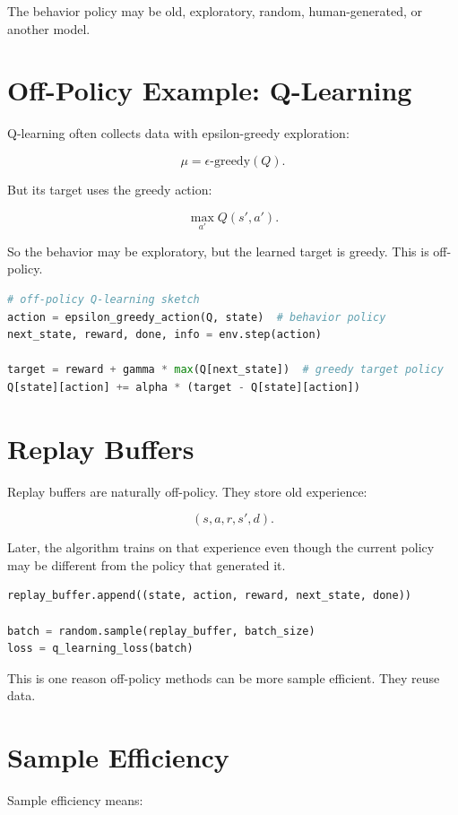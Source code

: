 \documentclass[11pt]{article}
\begin{document}
The behavior policy may be old, exploratory, random, human-generated, or another model.

\section{Off-Policy Example: Q-Learning}

Q-learning often collects data with epsilon-greedy exploration:

\[
\mu = \epsilon\text{-greedy}(Q).
\]

But its target uses the greedy action:

\[
\max_{a'} Q(s',a').
\]

So the behavior may be exploratory, but the learned target is greedy.
This is off-policy.

\begin{lstlisting}[language=Python]
# off-policy Q-learning sketch
action = epsilon_greedy_action(Q, state)  # behavior policy
next_state, reward, done, info = env.step(action)

target = reward + gamma * max(Q[next_state])  # greedy target policy
Q[state][action] += alpha * (target - Q[state][action])
\end{lstlisting}

\section{Replay Buffers}

Replay buffers are naturally off-policy.
They store old experience:

\[
(s,a,r,s',d).
\]

Later, the algorithm trains on that experience even though the current policy may be different from the policy that generated it.

\begin{lstlisting}[language=Python]
replay_buffer.append((state, action, reward, next_state, done))

batch = random.sample(replay_buffer, batch_size)
loss = q_learning_loss(batch)
\end{lstlisting}

This is one reason off-policy methods can be more sample efficient.
They reuse data.

\section{Sample Efficiency}

Sample efficiency means:
\end{document}
